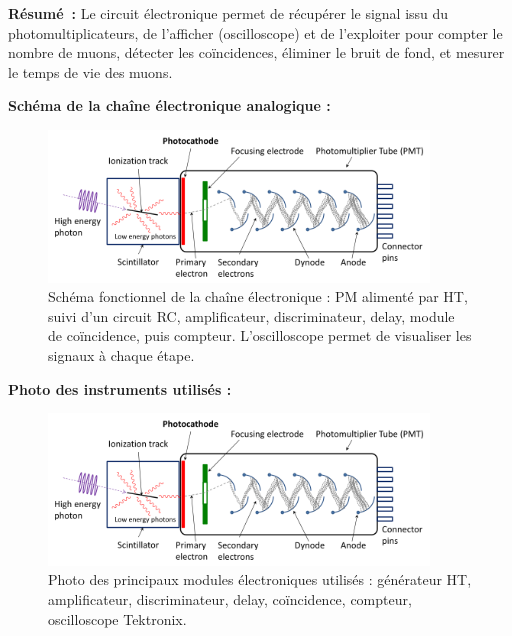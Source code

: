 \documentclass[a4paper,12pt,twoside]{article}
\begin{document}
\begin{remarque}
\textbf{Résumé~:} Le circuit électronique permet de récupérer le signal issu du photomultiplicateurs, de l’afficher (oscilloscope) et de l’exploiter pour compter le nombre de muons, détecter les coïncidences, éliminer le bruit de fond, et mesurer le temps de vie des muons.
\end{remarque}

\vspace{1em}
\noindent
\textbf{Schéma de la chaîne électronique analogique :}

\begin{figure}[H]
  \centering
  \includegraphics[width=0.9\textwidth]{Images/PhotoMultiplierTubeAndScintillator.png}
  \caption{Schéma fonctionnel de la chaîne électronique : PM alimenté par HT, suivi d’un circuit RC, amplificateur, discriminateur, delay, module de coïncidence, puis compteur. L’oscilloscope permet de visualiser les signaux à chaque étape.}
  \label{fig:schema_elec_analogique}
\end{figure}

\vspace{1em}
\noindent
\textbf{Photo des instruments utilisés :}

\begin{figure}[H]
  \centering
  \includegraphics[width=0.9\textwidth]{Images/PhotoMultiplierTubeAndScintillator.png}
  \caption{Photo des principaux modules électroniques utilisés : générateur HT, amplificateur, discriminateur, delay, coïncidence, compteur, oscilloscope Tektronix.}
  \label{fig:photo_instruments}
\end{figure}
\end{document}

